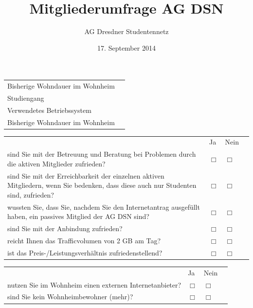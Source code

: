 \documentclass[a4paper,10pt]{scrreprt}
\title{Mitgliederumfrage AG DSN}
\author{AG Dresdner Studentennetz}
\date{17. September 2014}
\renewcommand{\vertikalblocktwo}[3]{\vspace{0.1cm}\begin{tabular}{p{10cm}p{2cm}p{2cm}p{0.001cm}}&\centering #1&\centering #2&\\#3\end{tabular}\vspace{0.5cm}}
\renewcommand{\blocktexttwo}[1]{#1\vspace{0.2cm}& \centering$\Box$ & \centering$\Box$&\\}
\renewcommand{\longline}{\raisebox{-3mm}{\parbox{8cm}{\hrule\strut}}}
\renewenvironment{answersA}{\vspace{0.25cm}\begin{addmargin}[0cm]{4cm}\begin{compactitem}[]}{\end{compactitem}\end{addmargin}}
\begin{document}
    \thispagestyle{fancy}
    \renewcommand{\headrulewidth}{0pt}
    \renewcommand{\footrulewidth}{0pt}
    \setlength\headheight{80.0pt}
    \addtolength{\textheight}{-80.0pt}

    \begin{answersA}
        \item{}
        \item{}
        \item{}
        \item{}
        \item{}\vspace{.25cm}
        \item{}
    \end{answersA}

    \begin{tabular}{ p{6cm} l }
        Bisherige Wohndauer im Wohnheim & \longline \\
        Studiengang & \longline \\
        Verwendetes Betriebssystem & \longline \\
        Bisherige Wohndauer im Wohnheim & \longline
    \end{tabular}

    \vertikalblocktwo{Ja}{Nein}{
        \blocktexttwo{sind Sie mit der Betreuung und Beratung bei Problemen durch die aktiven Mitglieder zufrieden?}
        \blocktexttwo{sind Sie mit der Erreichbarkeit der einzelnen aktiven Mitgliedern, wenn Sie bedenken, dass diese auch nur Studenten sind, zufrieden?}
        \blocktexttwo{wussten Sie, dass Sie, nachdem Sie den Internetantrag ausgefüllt haben, ein passives Mitglied der AG DSN sind?}
        \blocktexttwo{sind Sie mit der Anbindung zufrieden?}
        \blocktexttwo{reicht Ihnen das Trafficvolumen von 2 GB am Tag?}
        \blocktexttwo{ist das Preis-/Leistungsverhältnis zufriedenstellend?}
    }

    \vertikalblocktwo{Ja}{Nein}{
        \blocktexttwo{nutzen Sie im Wohnheim einen externen Internetanbieter?}
        \blocktexttwo{sind Sie kein Wohnheimbewohner (mehr)?}
    }

    \opentwo
\end{document}

